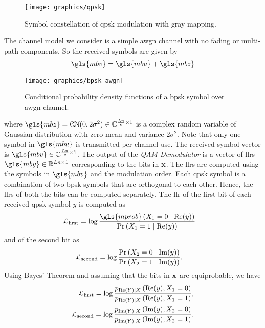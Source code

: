 \begin{figure}[htbp]
  \centering
  \texttt{[image: graphics/qpsk]}
  \caption{Symbol constellation of \gls{qpsk} modulation with gray mapping.}
  \label{fig:qpsk}
\end{figure}

The channel model we consider is a simple \gls{awgn} channel with no fading or multi-path components. So the received symbols are given by \begin{align}\gls{mbv}=\gls{mbu}+\gls{mbz}\end{align}
\begin{figure}[htbp]
  \centering
  \texttt{[image: graphics/bpsk\_awgn]}
  \caption{Conditional probability density functions of a \gls{bpsk} symbol over \gls{awgn} channel.}
  \label{fig:bpsk_awgn}
\end{figure}
where $\gls{mbz}=\mathcal{CN}(0,2\sigma^2)\in\mathbb{C}^{\frac{Ln}{o}\times 1}$ is a complex random variable of Gaussian distribution with zero mean and variance $2\sigma^2$. Note that only one symbol in $\gls{mbu}$ is transmitted per channel use. The received symbol vector is $\gls{mbv}\in\mathbb{C}^{\frac{Ln}{o}\times 1}$. The output of the \emph{QAM Demodulator} is a vector of \glspl{llr} $\gls{mby}\in\mathbb{R}^{Ln\times 1}$ corresponding to the bits in $\mathbf{x}$. The \glspl{llr} are computed using the symbols in $\gls{mbv}$ and the modulation order. Each \gls{qpsk} symbol is a combination of two \gls{bpsk} symbols that are orthogonal to each other. Hence, the \glspl{llr} of both the bits can be computed separately. The \gls{llr} of the first bit of each received \gls{qpsk} symbol $y$ is computed as
\begin{align}
\mathcal{L}_{\text{first}}&=\log\frac{\gls{mprob}\left(X_1=0\mid\re(y)\right)}{\prob\left(X_1=1\mid\re(y)\right)}
\end{align}
and of the second bit as
\begin{align}
\mathcal{L}_{\text{second}}&=\log\frac{\text{Pr}\left(X_2=0\mid\operatorname{Im}(y)\right)}{\text{Pr}\left(X_2=1\mid\operatorname{Im}(y)\right)}.
\end{align}
Using Bayes' Theorem and assuming that the bits in $\mathbf{x}$ are equiprobable, we have
\begin{align}
\mathcal{L}_{\text{first}}=\log\frac{p_{\operatorname{Re}(Y)\mid X}\left(\operatorname{Re}(y), X_1=0\right)}{p_{\operatorname{Re}(Y)\mid X}\left(\operatorname{Re}(y), X_1=1\right)},\\
\mathcal{L}_{\text{second}}=\log\frac{p_{\operatorname{Im}(Y)\mid X}\left(\operatorname{Im}(y), X_2=0\right)}{p_{\operatorname{Im}(Y)\mid X}\left(\operatorname{Im}(y), X_2=1\right)}.
\end{align}
